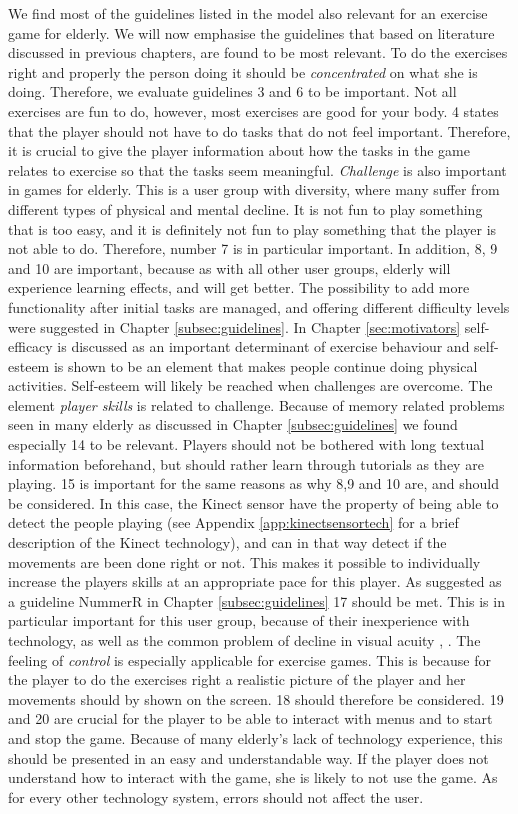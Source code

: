 We find most of the guidelines listed in the model also relevant for an exercise game for elderly. We will now emphasise the guidelines that based on literature discussed in previous chapters, are found to be most relevant. 
To do the exercises right and properly the person doing it should be \emph{concentrated} on what she is doing. Therefore, we evaluate guidelines 3 and 6 to be important. Not all exercises are fun to do, however, most exercises are good for your body. 4 states that the player should not have to do tasks that do not feel important. Therefore, it is crucial to give the player information about how the tasks in the game relates to exercise so that the tasks seem meaningful. \emph{Challenge} is also important in games for elderly. This is a user group with diversity, where many suffer from different types of physical and mental decline. It is not fun to play something that is too easy, and it is definitely not fun to play something that the player is not able to do. Therefore, number 7 is in particular important.  In addition, 8, 9 and 10 are important, because as with all other user groups, elderly will experience learning effects, and will get better. The possibility to add more functionality after initial tasks are managed, and offering different difficulty levels were suggested in Chapter \ref{subsec:guidelines}. In Chapter \ref{sec:motivators} self-efficacy is discussed as an important determinant of exercise behaviour and self-esteem is shown to be an element that makes people continue doing physical activities. Self-esteem will likely be reached when challenges are overcome.  The element \emph{player skills} is related to challenge. Because of memory related problems seen in many elderly as discussed in Chapter \ref{subsec:guidelines} we found especially 14 to be relevant. Players should not be bothered with long textual information beforehand, but should rather learn through tutorials as they are playing. 15 is important for the same reasons as why 8,9 and 10 are, and should be considered. In this case, the Kinect sensor have the property of being able to detect the people playing (see Appendix \ref{app:kinectsensortech} for a brief description of the Kinect technology), and can in that way detect if the movements are been done right or not. This makes it possible to individually increase the players skills at an appropriate pace for this player. As suggested as a guideline NummerR in Chapter \ref{subsec:guidelines} 17 should be met. This is in particular important for this user group, because of their inexperience with technology, as well as the common problem of decline in visual acuity \cite{Billis}, \cite{gregor}. The feeling of \emph{control} is especially applicable for exercise games. This is because for the player to do the exercises right a realistic picture of the player and her movements should by shown on the screen.  18 should therefore be considered. 19 and 20 are crucial for the player to be able to interact with menus and to start and stop the game. Because of many elderly's lack of technology experience, this should be presented in an easy and understandable way. If the player does not understand how to interact with the game, she is likely to not use the game. As for every other technology system, errors should not affect the user. 